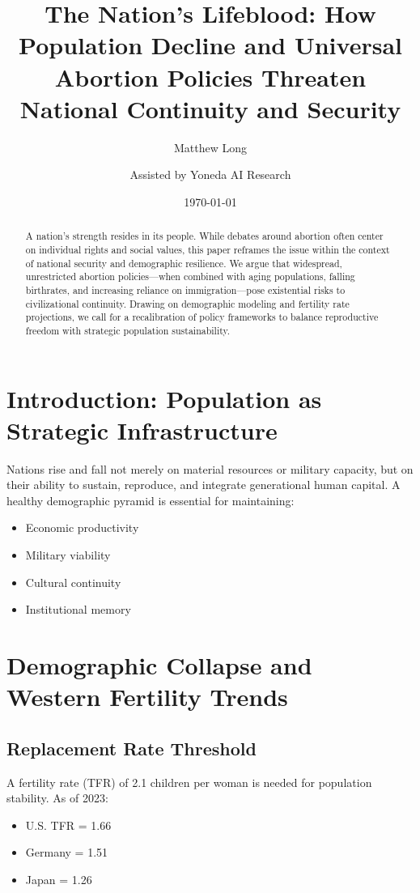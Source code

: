 \documentclass[11pt]{article}
\title{\textbf{The Nation's Lifeblood: How Population Decline and Universal Abortion Policies Threaten National Continuity and Security}}
\author[1]{Matthew Long}
\author[2]{Assisted by Yoneda AI Research}
\affil[1]{Independent National Strategy Analyst}
\affil[2]{AI-Augmented Population Resilience Lab}
\date{\today}
\begin{document}
\maketitle

\begin{abstract}
A nation's strength resides in its people. While debates around abortion often center on individual rights and social values, this paper reframes the issue within the context of national security and demographic resilience. We argue that widespread, unrestricted abortion policies—when combined with aging populations, falling birthrates, and increasing reliance on immigration—pose existential risks to civilizational continuity. Drawing on demographic modeling and fertility rate projections, we call for a recalibration of policy frameworks to balance reproductive freedom with strategic population sustainability.
\end{abstract}

\section{Introduction: Population as Strategic Infrastructure}
Nations rise and fall not merely on material resources or military capacity, but on their ability to sustain, reproduce, and integrate generational human capital. A healthy demographic pyramid is essential for maintaining:
\begin{itemize}
    \item Economic productivity
    \item Military viability
    \item Cultural continuity
    \item Institutional memory
\end{itemize}

\section{Demographic Collapse and Western Fertility Trends}
\subsection{Replacement Rate Threshold}
A fertility rate (TFR) of 2.1 children per woman is needed for population stability. As of 2023:
\begin{itemize}
    \item U.S. TFR = 1.66
    \item Germany = 1.51
    \item Japan = 1.26
\end{itemize}
\end{document}
